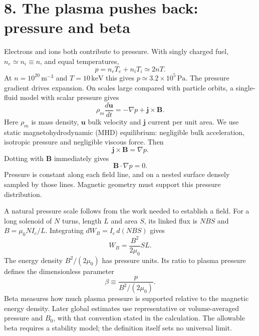 \documentclass[11pt]{article}
\begin{document}
\section*{8. The plasma pushes back: pressure and beta}
Electrons and ions both contribute to pressure. With singly charged fuel,
$n_e\simeq n_i\equiv n$, and equal temperatures,
\begin{equation}
 p=n_eT_e+n_iT_i\simeq2nT.
 \label{eq:pressure}
\end{equation}
At $n=10^{20}\,\mathrm{m^{-3}}$ and $T=10\,\mathrm{keV}$ this gives
$p\simeq3.2\times10^5\,\mathrm{Pa}$. The pressure gradient drives expansion.
On scales large compared with particle orbits, a single-fluid model with scalar
pressure gives
\begin{equation}
 \rho_m\frac{d\mathbf u}{dt}=-\nabla p+\mathbf j\times\mathbf B.
 \label{eq:mhdmomentum}
\end{equation}
Here $\rho_m$ is mass density, $\mathbf u$ bulk velocity and $\mathbf j$ current
per unit area. We use static magnetohydrodynamic (MHD) equilibrium: negligible bulk
acceleration, isotropic pressure and negligible viscous force. Then
\begin{equation}
 \mathbf j\times\mathbf B=\nabla p.
 \label{eq:forcebalance}
\end{equation}
Dotting with $\mathbf B$ immediately gives
\begin{equation}
 \mathbf B\cdot\nabla p=0.
 \label{eq:pressurefieldline}
\end{equation}
Pressure is constant along each field line, and on a nested surface densely sampled
by those lines. Magnetic geometry must support this pressure distribution.

A natural pressure scale follows from the work needed to establish a field. For a
long solenoid of $N$ turns, length $L$ and area $S$, its linked flux is $NBS$ and
$B=\mu_0NI_c/L$. Integrating $dW_B=I_c\,d(NBS)$ gives
\begin{equation}
 W_B=\frac{B^2}{2\mu_0}SL.
 \label{eq:fieldenergy}
\end{equation}
The energy density $B^2/(2\mu_0)$ has pressure units. Its ratio to plasma pressure
defines the dimensionless parameter
\begin{equation}
 \beta\equiv\frac{p}{B^2/(2\mu_0)}.
 \label{eq:beta}
\end{equation}
Beta measures how much plasma pressure is supported relative to the magnetic energy
density. Later global estimates use representative or volume-averaged pressure and
$B_0$, with that convention stated in the calculation. The allowable beta requires a
stability model; the definition itself sets no universal limit.
\end{document}
